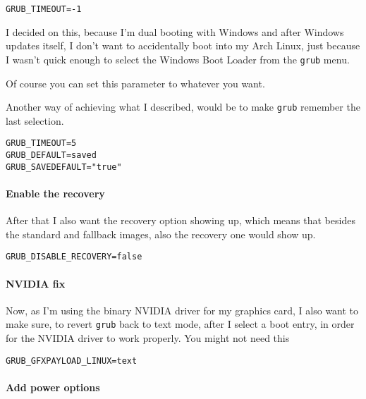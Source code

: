 \documentclass[10pt]{dustdoc}
\begin{document}
\begin{verbatim}
GRUB_TIMEOUT=-1
\end{verbatim}

\begin{NOTE}
    I decided on this, because I’m dual booting with Windows and after Windows updates itself, I don’t want to accidentally boot into my Arch Linux, just because I wasn’t quick enough to select the Windows Boot Loader from the \texttt{grub} menu.

    Of course you can set this parameter to whatever you want.

    Another way of achieving what I described, would be to make \texttt{grub} remember the last selection.

    \begin{verbatim}
GRUB_TIMEOUT=5
GRUB_DEFAULT=saved
GRUB_SAVEDEFAULT="true"
    \end{verbatim}
\end{NOTE}

\paragraph{Enable the recovery}
\label{par:enable-the-recovery}

After that I also want the recovery option showing up, which means that besides the standard and fallback images, also the recovery one would show up.

\begin{verbatim}
GRUB_DISABLE_RECOVERY=false
\end{verbatim}

\paragraph{NVIDIA fix}
\label{par:nvidia-fix}

Now, as I’m using the binary NVIDIA driver for my graphics card, I also want to make sure, to revert \texttt{grub} back to text mode, after I select a boot entry, in order for the NVIDIA driver to work properly.
You might not need this

\begin{verbatim}
GRUB_GFXPAYLOAD_LINUX=text
\end{verbatim}

\paragraph{Add power options}
\label{par:add-power-options}
\end{document}
